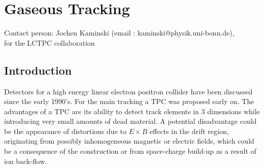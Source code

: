 %


% 
\section{Gaseous Tracking}
Contact person: Jochen Kaminski (email : kaminski@physik.uni-bonn.de),\\for the LCTPC collaboration \\

\subsection{Introduction}

Detectors for a high energy linear electron positron collider have been discussed since the early 1990's. For the main tracking a TPC was proposed early on.
The advantages of a TPC are its ability to detect track elements in 3 dimensions while introducing very small amounts of dead material. A potential disadvantage could be the appearance of distortions due to $E \times B$ effects in the drift region, originating from possibly inhomogeneous magnetic or electric fields, which could be a consequence of the construction or from space-charge build-up as a result of ion back-flow.

